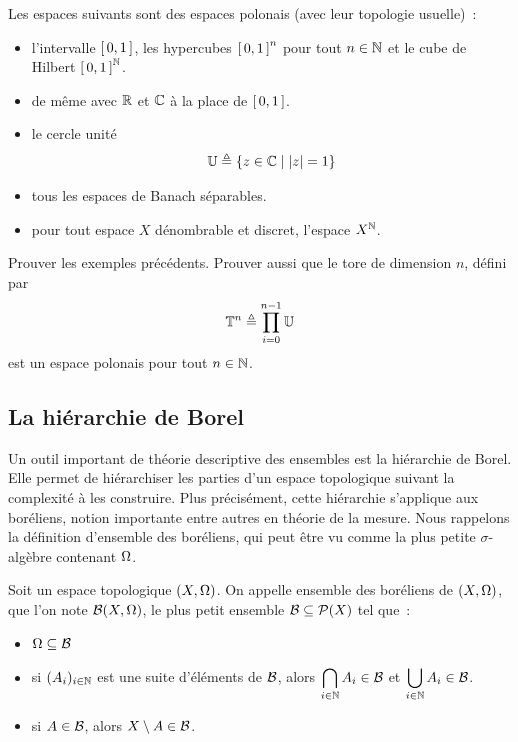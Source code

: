 \begin{example}
  Les espaces suivants sont des espaces polonais (avec leur topologie usuelle)~:
  \begin{itemize}
  \item l'intervalle $\mathord{\left[\,0,1\,\right]}$, les hypercubes $\mathord{\left[\,0,1\,\right]}^n$ pour tout
    $n\in\mathbb N$ et le cube de Hilbert $\mathord{\left[\,0,1\,\right]}^{\mathbb N}$.
  \item de même avec $\mathbb R$ et $\mathbb C$ à la place de $\mathord{\left[\,0,1\,\right]}$.
  \item le cercle unité \[\mathbb U \triangleq \left\{ z\in \mathbb C \;\middle\vert\; |z| = 1 \right\}\]
  \item tous les espaces de Banach séparables.
  \item pour tout espace $X$ dénombrable et discret, l'espace $X^\mathbb N$.
  \end{itemize}
\end{example}

\begin{exercise}
  Prouver les exemples précédents. Prouver aussi que le tore de dimension $n$,
  défini par
  \[\mathbb T^n \triangleq \prod_{i = 0}^{n-1} \mathbb U\]
  est un espace polonais pour tout $n \in \mathbb N$.
\end{exercise}

\subsection{La hiérarchie de Borel}

Un outil important de théorie descriptive des ensembles est la hiérarchie de
Borel. Elle permet de hiérarchiser les parties d'un espace topologique suivant
la complexité à les construire. Plus précisément, cette hiérarchie s'applique
aux boréliens, notion importante entre autres en théorie de la mesure. Nous
rappelons la définition d'ensemble des boréliens, qui peut être vu comme la plus
petite $\sigma$-algèbre contenant $\Omega$.

\begin{definition}
  Soit un espace topologique $(X,\Omega)$. On appelle ensemble des boréliens de
  $(X,\Omega)$, que l'on note $\mathcal{B}(X,\Omega)$, le plus petit ensemble
  $\mathcal{B}\subseteq \mathcal{P}(X)$ tel que~:
  \begin{itemize}
  \item $\Omega\subseteq \mathcal{B}$
  \item si $(A_i)_{i\in\mathbb N}$ est une suite d'éléments de $\mathcal{B}$, alors
    $\displaystyle\bigcap_{i\in\mathbb N} A_i\in \mathcal{B}$ et
    $\displaystyle\bigcup_{i\in\mathbb N} A_i\in\mathcal{B}$.
  \item si $A\in\mathcal{B}$, alors $X\setminus A \in \mathcal{B}$.
  \end{itemize}
\end{definition}

